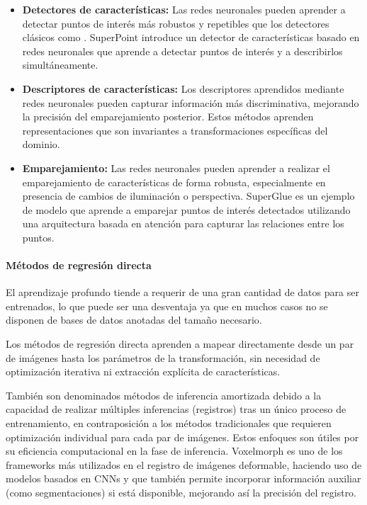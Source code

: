 \begin{itemize}
\item \textbf{Detectores de características:} Las redes neuronales pueden aprender a detectar puntos de interés más robustos y repetibles que los detectores clásicos como . SuperPoint \cite{superpoint} introduce un detector de características basado en redes neuronales que aprende a detectar puntos de interés y a describirlos simultáneamente.
\item \textbf{Descriptores de características:} Los descriptores aprendidos mediante redes neuronales pueden capturar información más discriminativa, mejorando la precisión del emparejamiento posterior. Estos métodos aprenden representaciones que son invariantes a transformaciones específicas del dominio.
\item \textbf{Emparejamiento:} Las redes neuronales pueden aprender a realizar el emparejamiento de características de forma robusta, especialmente en presencia de cambios de iluminación o perspectiva. SuperGlue \cite{superglue} es un ejemplo de modelo que aprende a emparejar puntos de interés detectados utilizando una arquitectura basada en atención para capturar las relaciones entre los puntos.
\end{itemize}

\paragraph{Métodos de regresión directa}
\label{par:direct_regression}

El aprendizaje profundo tiende a requerir de una gran cantidad de datos para ser entrenados, lo que puede ser una desventaja ya que en muchos casos no se disponen de bases de datos anotadas del tamaño necesario.

Los métodos de regresión directa aprenden a mapear directamente desde un par de imágenes hasta los parámetros de la transformación, sin necesidad de optimización iterativa ni extracción explícita de características.

También son denominados métodos de inferencia amortizada debido a la capacidad de realizar múltiples inferencias (registros) tras un único proceso de entrenamiento, en contraposición a los métodos tradicionales que requieren optimización individual para cada par de imágenes.
Estos enfoques son útiles por su eficiencia computacional en la fase de inferencia. Voxelmorph \cite{Balakrishnan_2019voxelmorph} es uno de los frameworks más utilizados en el registro de imágenes deformable, haciendo uso de modelos basados en \gls{CNN}s y que también permite incorporar información auxiliar (como segmentaciones) si está disponible, mejorando así la precisión del registro.

